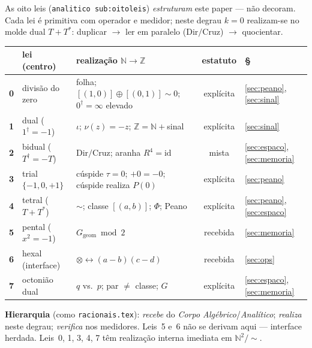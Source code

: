 \documentclass[11pt,a4paper]{article}
\newcommand{\code}[1]{\texttt{\small #1}}
\newcommand{\dg}{^{\dagger}}
\begin{document}

\noindent As oito leis (\code{analitico sub:oitoleis}) \emph{estruturam} este
paper --- não decoram. Cada lei é primitiva com operador e medidor; neste
degrau $k{=}0$ realizam-se no molde dual $T+T^{*}$:
duplicar $\to$ ler em paralelo ($\mathrm{Dir}/\mathrm{Cruz}$) $\to$ quocientar.

\begin{center}\small
\begin{tabular}{@{}clp{4.6cm}cl@{}}
\toprule
 & lei (centro) & realização $\mathbb{N}\!\to\!\mathbb{Z}$ & estatuto & § \\
\midrule
\textbf{0} & divisão do zero & folha; $[(1,0)]\oplus[(0,1)]\sim0$; $0\dg=\infty$ elevado & explícita & \ref{sec:peano}, \ref{sec:sinal} \\
\textbf{1} & dual ($1\dg=-1$) & $\iota$; $\nu(z)=-z$; $\mathbb{Z}=\mathbb{N}+{}$sinal & explícita & \ref{sec:sinal} \\
\textbf{2} & bidual ($T\dg=-T$) & $\mathrm{Dir}/\mathrm{Cruz}$; aranha $R^{4}=\mathrm{id}$ & mista & \ref{sec:espaco}, \ref{sec:memoria} \\
\textbf{3} & trial $\{-1,0,+1\}$ & cúspide $\tau=0$; $+0=-0$; cúspide realiza $P(0)$ & explícita & \ref{sec:peano} \\
\textbf{4} & tetral ($T+T^{*}$) & $\sim$; classe $[(a,b)]$; $\Phi$; Peano & explícita & \ref{sec:peano}, \ref{sec:espaco} \\
\textbf{5} & pental ($x^{2}=-1$) & $G_{\mathrm{geom}}\bmod2$ & recebida & \ref{sec:memoria} \\
\textbf{6} & hexal (interface) & $\otimes\leftrightarrow(a-b)(c-d)$ & recebida & \ref{sec:ops} \\
\textbf{7} & octonião dual & $q$ vs.\ $p$; par $\neq$ classe; $G$ & explícita & \ref{sec:espaco}, \ref{sec:memoria} \\
\bottomrule
\end{tabular}
\end{center}

\noindent\textbf{Hierarquia} (como \code{racionais.tex}): \emph{recebe} do
\emph{Corpo Algébrico}/\emph{Analítico}; \emph{realiza} neste degrau;
\emph{verifica} nos medidores. Leis~5 e~6 não se derivam aqui --- interface
herdada. Leis~0, 1, 3, 4, 7 têm realização interna imediata em
$\mathbb{N}^{2}/{\sim}$.
\end{document}
